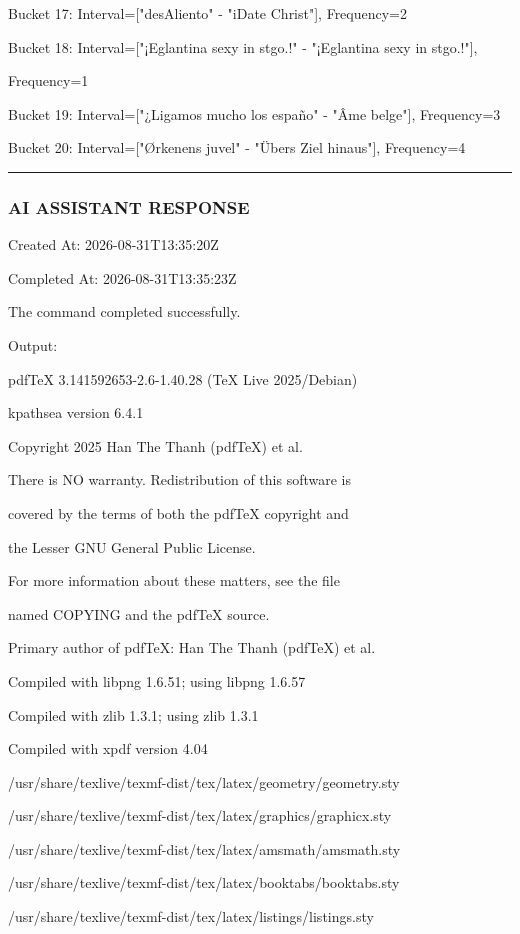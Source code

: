 \documentclass[11pt,a4paper]{article}
\begin{document}
{Bucket 17: Interval=["desAliento" - "iDate Christ"], Frequency=2

Bucket 18: Interval=["¡Eglantina sexy in stgo.!" - "¡Eglantina sexy in stgo.!"],

Frequency=1

Bucket 19: Interval=["¿Ligamos mucho los españo" - "Âme belge"], Frequency=3

Bucket 20: Interval=["Ørkenens juvel" - "Übers Ziel hinaus"], Frequency=4


\hrule

\subsubsection{AI ASSISTANT RESPONSE}

Created At: 2026-08-31T13:35:20Z

Completed At: 2026-08-31T13:35:23Z


The command completed successfully.

Output:

pdfTeX 3.141592653-2.6-1.40.28 (TeX Live 2025/Debian)

kpathsea version 6.4.1

Copyright 2025 Han The Thanh (pdfTeX) et al.

There is NO warranty.  Redistribution of this software is

covered by the terms of both the pdfTeX copyright and

the Lesser GNU General Public License.

For more information about these matters, see the file

named COPYING and the pdfTeX source.

Primary author of pdfTeX: Han The Thanh (pdfTeX) et al.

Compiled with libpng 1.6.51; using libpng 1.6.57

Compiled with zlib 1.3.1; using zlib 1.3.1

Compiled with xpdf version 4.04

/usr/share/texlive/texmf-dist/tex/latex/geometry/geometry.sty

/usr/share/texlive/texmf-dist/tex/latex/graphics/graphicx.sty

/usr/share/texlive/texmf-dist/tex/latex/amsmath/amsmath.sty

/usr/share/texlive/texmf-dist/tex/latex/booktabs/booktabs.sty

/usr/share/texlive/texmf-dist/tex/latex/listings/listings.sty

}
\end{document}
